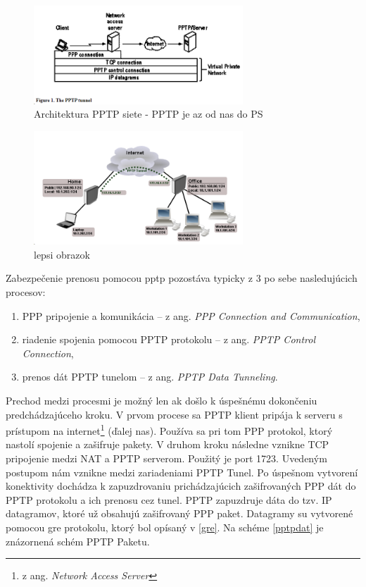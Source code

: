 \begin{figure}[h]
	\centering
	\includegraphics[width=0.7\textwidth]{figures/ptptun}
	\caption{Architektura PPTP siete - PPTP je az od nas do PS}
	\label{ptptun}
\end{figure}
\begin{figure}[h]
	\centering
	\includegraphics[width=0.7\textwidth]{figures/pptpcon}
	\caption{lepsi obrazok}
	\label{pptpcon}
\end{figure}

Zabezpečenie prenosu pomocou \acrshort{pptp} pozostáva typicky z 3 po sebe nasledujúcich procesov:
\begin{enumerate}
	\item{PPP pripojenie a komunikácia } -- z ang. \textit{PPP Connection and Communication},
	\item{riadenie spojenia pomocou PPTP protokolu} -- z ang. \textit{PPTP Control Connection},
	\item{prenos dát PPTP tunelom} -- z ang. \textit{PPTP Data Tunneling}.
\end{enumerate}
Prechod medzi procesmi je možný len ak došlo k úspešnému dokončeniu predchádzajúceho kroku. V prvom procese sa PPTP klient pripája k serveru s prístupom na internet\footnote{z ang. \textit{Network Access Server}} (ďalej \acrshort{nas}). Používa sa pri tom PPP protokol, ktorý nastolí spojenie a zašifruje pakety. V druhom kroku následne vznikne TCP pripojenie medzi NAT a PPTP serverom. Použitý je port 1723. Uvedeným postupom nám vznikne medzi zariadeniami PPTP Tunel. Po úspešnom vytvorení konektivity dochádza k zapuzdrovaniu prichádzajúcich zašifrovaných PPP dát do PPTP protokolu a ich prenosu cez tunel. PPTP zapuzdruje dáta do tzv. IP datagramov, ktoré už obsahujú zašifrovaný PPP paket. Datagramy su vytvorené pomocou \acrshort{gre} protokolu, ktorý bol opísaný v \ref{gre}. Na schéme \ref{pptpdat} je znázornená schém PPTP Paketu. 

